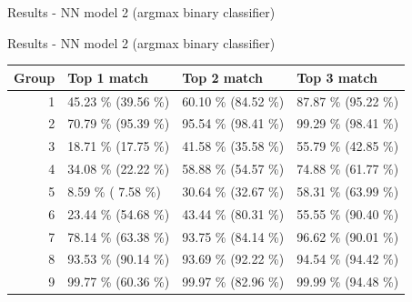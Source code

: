 \documentclass{beamer}
\newcommand\Fontsmall{\fontsize{8}{7.2}\selectfont}
\begin{document}
\begin{darkframes}
\begin{frame}{Results - NN model 2 (argmax binary classifier)}
\begin{figure}[H]
\begin{minipage}{.33\textwidth}
        \end{minipage}%
      \end{figure}
    \end{frame}

    \begin{frame}{Results - NN model 2 (argmax binary classifier)}
      \Fontsmall
      \begin{table}[!b]
        {\carlitoTLF %
        \begin{tabularx}{\textwidth}{r|X|X|X}
\toprule
          Group & Top 1 match                     & Top 2 match                     & Top 3 match                     \\
\bottomrule
1     & 45.23 \% {\color[HTML]{9B9B9B} (39.56 \%)} & 60.10 \% {\color[HTML]{9B9B9B} (84.52 \%)} & 87.87 \% {\color[HTML]{9B9B9B} (95.22 \%)} \\

2     & 70.79 \% {\color[HTML]{9B9B9B} (95.39 \%)} & 95.54 \% {\color[HTML]{9B9B9B} (98.41 \%)} & 99.29 \% {\color[HTML]{9B9B9B} (98.41 \%)} \\

3     & 18.71 \% {\color[HTML]{9B9B9B} (17.75 \%)} & 41.58 \% {\color[HTML]{9B9B9B} (35.58 \%)} & 55.79 \% {\color[HTML]{9B9B9B} (42.85 \%)} \\

4     & 34.08 \% {\color[HTML]{9B9B9B} (22.22 \%)} & 58.88 \% {\color[HTML]{9B9B9B} (54.57 \%)} & 74.88 \% {\color[HTML]{9B9B9B} (61.77 \%)} \\

5     & 8.59 \% {\color[HTML]{9B9B9B}( 7.58 \%)}  & 30.64 \% {\color[HTML]{9B9B9B} (32.67 \%)} & 58.31 \% {\color[HTML]{9B9B9B} (63.99 \%)} \\

6     & 23.44 \% {\color[HTML]{9B9B9B} (54.68 \%)} & 43.44 \% {\color[HTML]{9B9B9B} (80.31 \%)} & 55.55 \% {\color[HTML]{9B9B9B} (90.40 \%)} \\

7     & 78.14 \% {\color[HTML]{9B9B9B} (63.38 \%)} & 93.75 \% {\color[HTML]{9B9B9B} (84.14 \%)} & 96.62 \% {\color[HTML]{9B9B9B} (90.01 \%)} \\

8     & 93.53 \% {\color[HTML]{9B9B9B} (90.14 \%)} & 93.69 \% {\color[HTML]{9B9B9B} (92.22 \%)} & 94.54 \% {\color[HTML]{9B9B9B} (94.42 \%)} \\

9     & 99.77 \% {\color[HTML]{9B9B9B} (60.36 \%)} & 99.97 \% {\color[HTML]{9B9B9B} (82.96 \%)} & 99.99 \% {\color[HTML]{9B9B9B} (94.48 \%)} \\


\end{tabularx}}
\end{table}
\end{frame}
\end{darkframes}
\end{document}

